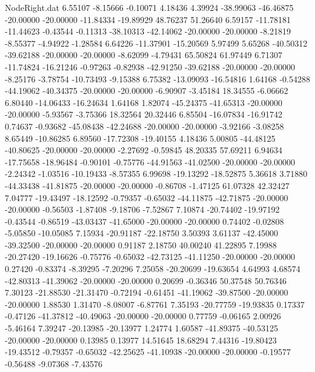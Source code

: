 \begin{filecontents}{NodeRight.dat}
   6.55107   -8.15666   -0.10071     4.18436    4.39924  -38.99063  -46.46875  -20.00000  -20.00000  -11.84334  -19.89929   48.76237   51.26640
   6.59157  -11.78181  -11.44623    -0.43544   -0.11313  -38.10313  -42.14062  -20.00000  -20.00000   -8.21819   -8.55377   -4.94922   -1.28584
   6.64226  -11.37901  -15.20569     5.97499    5.65268  -40.50312  -39.62188  -20.00000  -20.00000   -8.62099   -4.79431   65.50824   61.97449
   6.71307  -11.74824  -16.21246    -0.97263   -0.82938  -42.91250  -39.62188  -20.00000  -20.00000   -8.25176   -3.78754  -10.73493   -9.15388
   6.75382  -13.09093  -16.54816     1.64168   -0.54288  -44.19062  -40.34375  -20.00000  -20.00000   -6.90907   -3.45184   18.34555   -6.06662
   6.80440  -14.06433  -16.24634     1.64168    1.82074  -45.24375  -41.65313  -20.00000  -20.00000   -5.93567   -3.75366   18.32564   20.32446
   6.85504  -16.07834  -16.91742     0.74637   -0.93682  -45.08438  -42.24688  -20.00000  -20.00000   -3.92166   -3.08258    8.65449  -10.86285
   6.89560  -17.72308  -19.40155     4.18436    5.00805  -44.48125  -40.80625  -20.00000  -20.00000   -2.27692   -0.59845   48.20335   57.69211
   6.94634  -17.75658  -18.96484    -0.90101   -0.75776  -44.91563  -41.02500  -20.00000  -20.00000   -2.24342   -1.03516  -10.19433   -8.57355
   6.99698  -19.13292  -18.52875     5.36618    3.71880  -44.33438  -41.81875  -20.00000  -20.00000   -0.86708   -1.47125   61.07328   42.32427
   7.04777  -19.43497  -18.12592    -0.79357   -0.65032  -44.11875  -42.71875  -20.00000  -20.00000   -0.56503   -1.87408   -9.18706   -7.52867
   7.10874  -20.74402  -19.97192    -0.43544   -0.86519  -43.03437  -41.65000  -20.00000  -20.00000    0.74402   -0.02808   -5.05850  -10.05085
   7.15934  -20.91187  -22.18750     3.50393    3.61137  -42.45000  -39.32500  -20.00000  -20.00000    0.91187    2.18750   40.00240   41.22895
   7.19988  -20.27420  -19.16626    -0.75776   -0.65032  -42.73125  -41.11250  -20.00000  -20.00000    0.27420   -0.83374   -8.39295   -7.20296
   7.25058  -20.20699  -19.63654     4.64993    4.68574  -42.80313  -41.39062  -20.00000  -20.00000    0.20699   -0.36346   50.37548   50.76346
   7.30123  -21.88530  -21.31470    -0.72194   -0.61451  -41.19062  -39.87500  -20.00000  -20.00000    1.88530    1.31470   -8.08007   -6.87761
   7.35193  -20.77759  -19.93835     0.17337   -0.47126  -41.37812  -40.49063  -20.00000  -20.00000    0.77759   -0.06165    2.00926   -5.46164
   7.39247  -20.13985  -20.13977     1.24774    1.60587  -41.89375  -40.53125  -20.00000  -20.00000    0.13985    0.13977   14.51645   18.68294
   7.44316  -19.80423  -19.43512    -0.79357   -0.65032  -42.25625  -41.10938  -20.00000  -20.00000   -0.19577   -0.56488   -9.07368   -7.43576

\end{filecontents}
